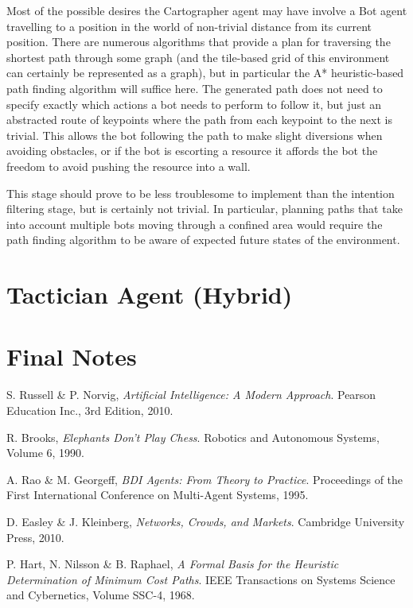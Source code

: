\documentclass[a4paper,10pt]{article}
\begin{document}
Most of the possible desires the Cartographer agent may have involve a Bot agent travelling to a position in the world of non-trivial distance from its current position. There are numerous algorithms that provide a plan for traversing the shortest path through some graph (and the tile-based grid of this environment can certainly be represented as a graph), but in particular the A* heuristic-based path finding algorithm\cite{hart68} will suffice here. The generated path does not need to specify exactly which actions a bot needs to perform to follow it, but just an abstracted route of keypoints where the path from each keypoint to the next is trivial. This allows the bot following the path to make slight diversions when avoiding obstacles, or if the bot is escorting a resource it affords the bot the freedom to avoid pushing the resource into a wall.

This stage should prove to be less troublesome to implement than the intention filtering stage, but is certainly not trivial. In particular, planning paths that take into account multiple bots moving through a confined area would require the path finding algorithm to be aware of expected future states of the environment.

\section{Tactician Agent (Hybrid)}

\section{Final Notes}

\begin{thebibliography}{9}
    S. Russell \& P. Norvig,
    \emph{Artificial Intelligence: A Modern Approach}. \newline
    Pearson Education Inc.,
    3rd Edition,
    2010.

    R. Brooks,
    \emph{Elephants Don't Play Chess}. \newline
    Robotics and Autonomous Systems,
    Volume 6,
    1990.

    A. Rao \& M. Georgeff,
    \emph{BDI Agents: From Theory to Practice}. \newline
    Proceedings of the First International Conference on Multi-Agent Systems,
    1995.

    D. Easley \& J. Kleinberg,
    \emph{Networks, Crowds, and Markets}. \newline
    Cambridge University Press,
    2010.

    P. Hart, N. Nilsson \& B. Raphael,
    \emph{A Formal Basis for the Heuristic Determination of Minimum Cost Paths}. \newline
    IEEE Transactions on Systems Science and Cybernetics,
    Volume SSC-4,
    1968.
\end{thebibliography}
\end{document}
